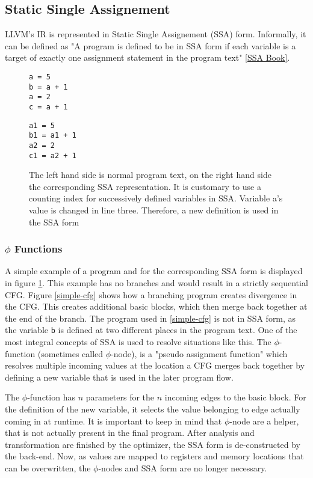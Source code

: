 \subsection{Static Single Assignement}
LLVM's IR is represented in Static Single Assignement (SSA) form. Informally, it can be defined as
"A program is defined to be in SSA form if each variable is a target of exactly one assignment
statement in the program text" \ref{SSA Book}.
\begin{figure}[t]
	\begin{minipage}{0.43\textwidth}	
\begin{lstlisting}[style=c]
a = 5
b = a + 1
a = 2
c = a + 1
\end{lstlisting}
	\end{minipage}\hfill
	\begin{minipage}{0.5\textwidth}
\begin{lstlisting}[style=c]
a1 = 5
b1 = a1 + 1
a2 = 2
c1 = a2 + 1
\end{lstlisting}
	\end{minipage}\hfill
	\caption{The left hand side is normal program text, on the right hand side the corresponding SSA representation. It is customary to use a counting index for successively defined variables in SSA. Variable a's value is changed in line three. Therefore, a new definition is used in the SSA form}
	\label{simpleSSA}
\end{figure}
\subsubsection{$\phi$ Functions}
A simple example of a program and for the corresponding SSA form  is displayed in figure \ref{simpleSSA}.
This example has no branches and would result in a strictly sequential CFG.
Figure \ref{simple-cfg} shows how a branching program creates divergence in the CFG. This creates additional basic blocks,
which then merge back together at the end of the branch. The program used in \ref{simple-cfg} is not in SSA form, as the variable \verb|b| is defined at two different places in the program text. One of the most integral concepts of SSA is used to resolve situations like this.
The $\phi$-function (sometimes called $\phi$-node), is a "pseudo assignment function"\cite{ssabook} which resolves multiple incoming values
at the location a CFG merges back together by defining a new variable that is used in the later program flow. 

The $\phi$-function has $n$ parameters for the $n$ incoming edges to the basic block. For the definition of the new variable, it selects
the value belonging to edge actually coming in at runtime. It is important to keep in mind that $\phi$-node are a helper, that is not
actually present in the final program. After analysis and transformation are finished by the optimizer, the SSA form is de-constructed
by the back-end. Now, as values are mapped to registers and memory locations that can be overwritten, the $\phi$-nodes and SSA form are no longer necessary.


